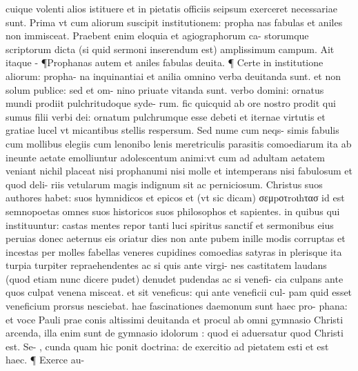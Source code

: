 \documentclass{article}
\begin{document}
\begin{pages}
cuique volenti alios istituere et in pietatis officiis seipsum exerceret necessariae sunt. Prima vt cum aliorum suscipit institutionem: propha nas fabulas et aniles non immisceat. Praebent enim eloquia et agiographorum ca- storumque scriptorum dicta (si quid sermoni inserendum est) amplissimum campum. Ait itaque - ¶Prophanas autem et aniles fabulas deuita. ¶ Certe in institutione aliorum: propha- na inquinantiai et anilia omnino verba deuitanda sunt. et non solum publice: sed et om- nino priuate vitanda sunt. verbo domini: ornatus mundi prodiit pulchritudoque syde- rum. fic quicquid ab ore nostro prodit qui sumus filii verbi dei: ornatum pulchrumque  esse debeti et iternae virtutis et gratiae lucel vt micantibus stellis respersum. Sed nume cum neqs- simis fabulis cum mollibus elegiis cum lenonibo lenis meretriculis parasitis comoediarum ita ab ineunte aetate emolliuntur adolescentum animi:vt cum ad adultam aetatem veniant  nichil placeat nisi prophanumi nisi molle et intemperans nisi fabulosum et quod deli- riis vetularum magis indignum sit ac perniciosum. Christus suos authores habet: suos hymnidicos et epicos et (vt sic dicam) σεμpοτroιhτασ id est semnopoetas omnes suos historicos suos philosophos et sapientes. in quibus qui instituuntur: castas mentes repor tanti luci spiritus sanctif et sermonibus eius peruias donec aeternus eis oriatur dies non ante pubem inille modis corruptas et incestas per molles fabellas veneres cupidines  comoedias satyras in plerisque ita turpia turpiter repraehendentes ac si quis ante virgi- nes castitatem laudans (quod etiam nunc dicere pudet) denudet pudendas ac si venefi- cia culpans ante quos culpat venena misceat. et sit veneficus: qui ante veneficii cul- pam quid esset veneficium prorsus nesciebat. hae fascinationes daemonum sunt haec pro- phana: et voce Pauli prae conis altissimi deuitanda et procul ab omni gymnasio Christi arcenda, illa enim sunt de gymnasio idolorum : quod ei aduersatur quod Christi est. Se- , cunda quam hic ponit doctrina: de exercitio ad pietatem esti et est haec. ¶ Exerce au-  \pend

\end{pages}
\end{document}
